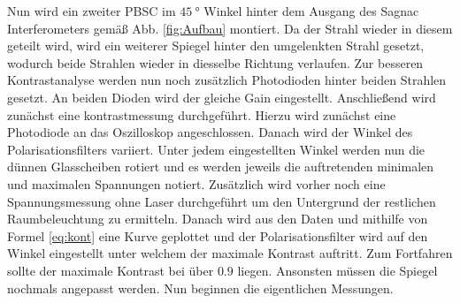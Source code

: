 Nun wird ein zweiter PBSC im $\SI{45}{\degree}$ Winkel hinter dem Ausgang des Sagnac Interferometers gemäß Abb. \ref{fig:Aufbau} montiert. Da der Strahl wieder in diesem geteilt wird, wird ein weiterer Spiegel hinter den umgelenkten Strahl gesetzt, wodurch beide Strahlen wieder in diesselbe Richtung verlaufen. Zur besseren Kontrastanalyse werden nun noch zusätzlich Photodioden hinter beiden Strahlen gesetzt. An beiden Dioden wird der gleiche Gain eingestellt.
 Anschließend wird zunächst eine kontrastmessung durchgeführt. Hierzu wird zunächst eine Photodiode an das Oszilloskop angeschlossen. Danach wird der Winkel des Polarisationsfilters variiert. Unter jedem eingestellten Winkel werden nun die dünnen Glasscheiben rotiert und es werden jeweils die auftretenden minimalen und maximalen Spannungen notiert. Zusätzlich wird vorher noch eine Spannungsmessung ohne Laser durchgeführt um den Untergrund der restlichen Raumbeleuchtung zu ermitteln. Danach wird aus den Daten und mithilfe von Formel \ref{eq:kont} eine Kurve geplottet und der Polarisationsfilter wird auf den Winkel eingestellt unter welchem der maximale Kontrast auftritt. Zum Fortfahren sollte der maximale Kontrast bei über $0.9$ liegen. Ansonsten müssen die Spiegel nochmals angepasst werden. 
Nun beginnen die eigentlichen Messungen.
